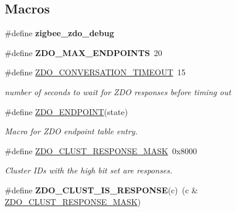 \subsection*{Macros}
\begin{DoxyCompactItemize}
\item 
\hypertarget{group__zdo_ga126dd7828d5c11842a466f1a792f8674}{\#define {\bfseries zigbee\-\_\-zdo\-\_\-debug}}\label{group__zdo_ga126dd7828d5c11842a466f1a792f8674}

\item 
\hypertarget{group__zdo_ga00aac62a0e22c8d6accd9bb701188c34}{\#define {\bfseries Z\-D\-O\-\_\-\-M\-A\-X\-\_\-\-E\-N\-D\-P\-O\-I\-N\-T\-S}~20}\label{group__zdo_ga00aac62a0e22c8d6accd9bb701188c34}

\item 
\hypertarget{group__zdo_gae1d68b13491e1e29493f412d984886e7}{\#define \hyperlink{group__zdo_gae1d68b13491e1e29493f412d984886e7}{Z\-D\-O\-\_\-\-C\-O\-N\-V\-E\-R\-S\-A\-T\-I\-O\-N\-\_\-\-T\-I\-M\-E\-O\-U\-T}~15}\label{group__zdo_gae1d68b13491e1e29493f412d984886e7}

\begin{DoxyCompactList}\small\item\em number of seconds to wait for Z\-D\-O responses before timing out \end{DoxyCompactList}\item 
\#define \hyperlink{group__zdo_gaef7118e478f5ad9949dcd23f6e0901c9}{Z\-D\-O\-\_\-\-E\-N\-D\-P\-O\-I\-N\-T}(state)
\begin{DoxyCompactList}\small\item\em Macro for Z\-D\-O endpoint table entry. \end{DoxyCompactList}\item 
\hypertarget{group__zdo_ga79de2096f8f5c8c313ad1c963a0c81e5}{\#define \hyperlink{group__zdo_ga79de2096f8f5c8c313ad1c963a0c81e5}{Z\-D\-O\-\_\-\-C\-L\-U\-S\-T\-\_\-\-R\-E\-S\-P\-O\-N\-S\-E\-\_\-\-M\-A\-S\-K}~0x8000}\label{group__zdo_ga79de2096f8f5c8c313ad1c963a0c81e5}

\begin{DoxyCompactList}\small\item\em Cluster I\-Ds with the high bit set are responses. \end{DoxyCompactList}\item 
\hypertarget{group__zdo_ga87a413d580d227c0a5da654c4177b154}{\#define {\bfseries Z\-D\-O\-\_\-\-C\-L\-U\-S\-T\-\_\-\-I\-S\-\_\-\-R\-E\-S\-P\-O\-N\-S\-E}(c)~(c \& \hyperlink{group__zdo_ga79de2096f8f5c8c313ad1c963a0c81e5}{Z\-D\-O\-\_\-\-C\-L\-U\-S\-T\-\_\-\-R\-E\-S\-P\-O\-N\-S\-E\-\_\-\-M\-A\-S\-K})}\label{group__zdo_ga87a413d580d227c0a5da654c4177b154}


\end{DoxyCompactItemize}
